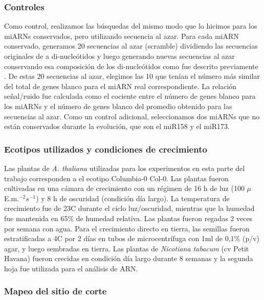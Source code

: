 \subsubsection{Controles}
Como control, realizamos las búsquedas del mismo modo que lo hicimos para los miARNs conservados, pero utilizando secuencia al azar.
Para cada miARN conservado, generamos 20 secuencias al azar (scramble) dividiendo las secuencias originales de a di-nucleótidos y luego generando nuevas secuencias al azar conservando esa composición de los di-nucleótidos como fue descrito previamente \citep{JonesRhoades2004787}.
De estas 20 secuencias al azar, elegimos las 10 que tenían el número más similar del total de genes blanco para el miARN real correspondiente.
La relación señal/ruido fue calculada como el cociente entre el número de genes blanco para los miARNs y el número de genes blanco del promedio obtenido para las secuencias al azar.
Como un control adicional, seleccionamos dos miARNs que no están conservados durante la evolución, que son el miR158 y el miR173.


\subsubsection{Ecotipos utilizados y condiciones de crecimiento}
Las plantas de \textit{A. thaliana} utilizadas para los experimentos en esta parte del trabajo corresponden a el ecotipo Columbia-0 Col-0.
Las plantas fueron cultivadas en una cámara de crecimiento con un régimen de 16 h de luz (100 $\mu$E.m.$^{-2}s^{-1}$) y 8 h de oscuridad (condición día largo).
La temperatura de crecimiento fue de 23\degree C durante el ciclo luz/oscuridad, mientras que la humedad fue mantenida en 65\% de humedad relativa.
Las plantas fueron regadas 2 veces por semana con agua.
Para el crecimiento directo en tierra, las semillas fueron estratificadas a 4\degree C por 2 días en tubos de microcentrífuga con 1ml de 0,1\% (p/v) agar, y luego sembradas en tierra.
Las plantas de \textit{Nicotiana tabacum} (cv Petit Havana) fueron crecidas en condición día largo durante 8 semanas y la segunda hoja fue utilizada para el análisis de ARN.


\subsubsection{Mapeo del sitio de corte}

